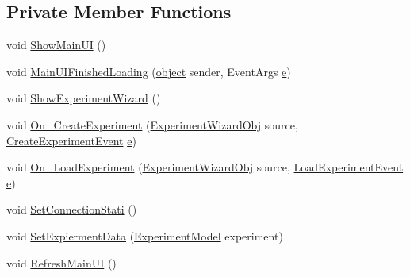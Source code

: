 \subsection*{Private Member Functions}
\begin{DoxyCompactItemize}
\item 
void \hyperlink{class_web_analyzer_1_1_controller_1_1_main_controller_aa87735ea9e190ab3221160fe4d232833}{Show\+Main\+U\+I} ()
\item 
void \hyperlink{class_web_analyzer_1_1_controller_1_1_main_controller_aab65da07ca7ce15a5957e7f01e260b86}{Main\+U\+I\+Finished\+Loading} (\hyperlink{_u_i_2_h_t_m_l_resources_2js_2lib_2underscore_8min_8js_aae18b7515bb2bc4137586506e7c0c903}{object} sender, Event\+Args \hyperlink{_u_i_2_h_t_m_l_resources_2js_2lib_2bootstrap_8min_8js_ab5902775854a8b8440bcd25e0fe1c120}{e})
\item 
void \hyperlink{class_web_analyzer_1_1_controller_1_1_main_controller_affb20dd05516641ec46676704f9c4a75}{Show\+Experiment\+Wizard} ()
\item 
void \hyperlink{class_web_analyzer_1_1_controller_1_1_main_controller_a128386d15417b0ae5e388f39d71c7535}{On\+\_\+\+Create\+Experiment} (\hyperlink{class_web_analyzer_1_1_u_i_1_1_interaction_objects_1_1_experiment_wizard_obj}{Experiment\+Wizard\+Obj} source, \hyperlink{class_web_analyzer_1_1_events_1_1_create_experiment_event}{Create\+Experiment\+Event} \hyperlink{_u_i_2_h_t_m_l_resources_2js_2lib_2bootstrap_8min_8js_ab5902775854a8b8440bcd25e0fe1c120}{e})
\item 
void \hyperlink{class_web_analyzer_1_1_controller_1_1_main_controller_abfc3aaeb8299f7890d08d7a150072b03}{On\+\_\+\+Load\+Experiment} (\hyperlink{class_web_analyzer_1_1_u_i_1_1_interaction_objects_1_1_experiment_wizard_obj}{Experiment\+Wizard\+Obj} source, \hyperlink{class_web_analyzer_1_1_events_1_1_load_experiment_event}{Load\+Experiment\+Event} \hyperlink{_u_i_2_h_t_m_l_resources_2js_2lib_2bootstrap_8min_8js_ab5902775854a8b8440bcd25e0fe1c120}{e})
\item 
void \hyperlink{class_web_analyzer_1_1_controller_1_1_main_controller_af163fb2f694b612e5bf4a854f09b119f}{Set\+Connection\+Stati} ()
\item 
void \hyperlink{class_web_analyzer_1_1_controller_1_1_main_controller_a9834e917d2a61f4d5adb424ed76e0622}{Set\+Expierment\+Data} (\hyperlink{class_web_analyzer_1_1_models_1_1_base_1_1_experiment_model}{Experiment\+Model} experiment)
\item 
void \hyperlink{class_web_analyzer_1_1_controller_1_1_main_controller_adaf2d5b304f6a713b9f08c9b4c7a6b62}{Refresh\+Main\+U\+I} ()

\end{DoxyCompactItemize}
